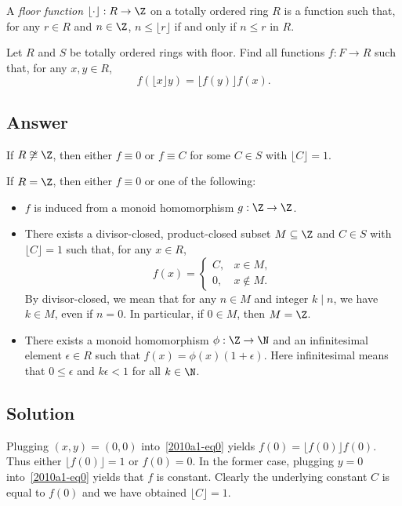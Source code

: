 A \emph{floor function} $\lfloor \cdot \rfloor : R \to \Z$ on a totally ordered ring $R$ is a function such that, for any $r \in R$ and $n \in \Z$, $n \leq \lfloor r \rfloor$ if and only if $n \leq r$ in $R$.

Let $R$ and $S$ be totally ordered rings with floor.
Find all functions $f : F \to R$ such that, for any $x, y \in R$,
\[ f(\lfloor x \rfloor y) = \lfloor f(y) \rfloor f(x). \tag{*}\label{2010a1-eq0} \]



\subsection*{Answer}

If $R \not\cong \Z$, then either $f \equiv 0$ or $f \equiv C$ for some $C \in S$ with $\lfloor C \rfloor = 1$.

If $R = \Z$, then either $f \equiv 0$ or one of the following:
\begin{itemize}
    
    \item
    $f$ is induced from a monoid homomorphism $g : \Z \to \Z$.

    \item
    There exists a divisor-closed, product-closed subset $M \subseteq \Z$ and $C \in S$ with $\lfloor C \rfloor = 1$ such that, for any $x \in R$,
    \[ f(x) = \begin{cases} C, & x \in M, \\ 0, & x \notin M. \end{cases} \]
    By divisor-closed, we mean that for any $n \in M$ and integer $k \mid n$, we have $k \in M$, even if $n = 0$.
    In particular, if $0 \in M$, then $M = \Z$.
    
    \item
    There exists a monoid homomorphism $\phi : \Z \to \N$ and an infinitesimal element $\epsilon \in R$ such that $f(x) = \phi(x)(1 + \epsilon)$.
    Here infinitesimal means that $0 \leq \epsilon$ and $k \epsilon < 1$ for all $k \in \N$.

\end{itemize}



\subsection*{Solution}

Plugging $(x, y) = (0, 0)$ into~\eqref{2010a1-eq0} yields $f(0) = \lfloor f(0) \rfloor f(0)$.
Thus either $\lfloor f(0) \rfloor = 1$ or $f(0) = 0$.
In the former case, plugging $y = 0$ into~\eqref{2010a1-eq0} yields that $f$ is constant.
Clearly the underlying constant $C$ is equal to $f(0)$ and we have obtained $\lfloor C \rfloor = 1$.

